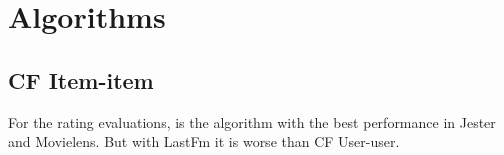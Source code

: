\documentclass[a4paper]{article}
\begin{document}


\section{Algorithms}
\subsection{CF Item-item}
For the rating evaluations, is the algorithm with the best performance in Jester and Movielens. But with LastFm it is worse than CF User-user.


\end{document}
